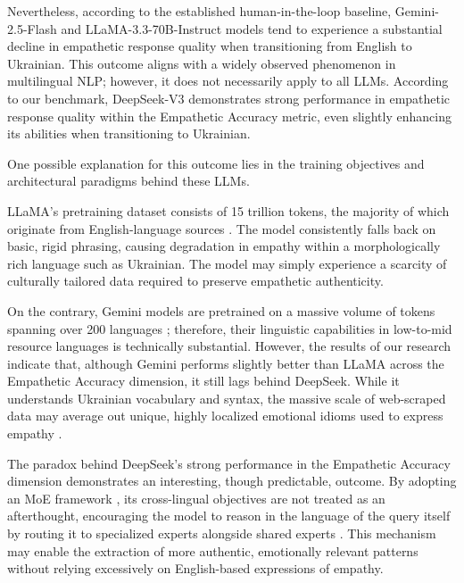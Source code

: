 \documentclass[10pt, twocolumn]{article}
\begin{document}
Nevertheless, according to the established human-in-the-loop baseline, Gemini-2.5-Flash  and LLaMA-3.3-70B-Instruct models tend to experience a substantial decline in empathetic response quality when transitioning from English to Ukrainian. This outcome aligns with a widely observed phenomenon in multilingual NLP; however, it does not necessarily apply to all LLMs. According to our benchmark, DeepSeek-V3 demonstrates strong performance in empathetic response quality within the Empathetic Accuracy metric, even slightly enhancing its abilities when transitioning to Ukrainian.

One possible explanation for this outcome lies in the training objectives and architectural paradigms behind these LLMs.

LLaMA's pretraining dataset consists of 15 trillion tokens, the majority of which originate from English-language sources \cite{grattafiori2024llama3herdmodels}. The model consistently falls back on basic, rigid phrasing, causing degradation in empathy within a morphologically rich language such as Ukrainian. The model may simply experience a scarcity of culturally tailored data required to preserve empathetic authenticity.

On the contrary, Gemini models are pretrained on a massive volume of tokens spanning over 200 languages \cite{comanici2025gemini25pushingfrontier}; therefore, their linguistic capabilities in low-to-mid resource languages is technically substantial. However, the results of our research indicate that, although Gemini performs slightly better than LLaMA across the Empathetic Accuracy dimension, it still lags behind DeepSeek. While it understands Ukrainian vocabulary and syntax, the massive scale of web-scraped data may average out unique, highly localized emotional idioms used to express empathy \cite{rystrom2025multilingual}.

The paradox behind DeepSeek's strong performance in the Empathetic Accuracy dimension demonstrates an interesting, though predictable, outcome. By adopting an MoE framework \cite{deepseekai2025deepseekv3technicalreport}, its cross-lingual objectives are not treated as an afterthought, encouraging the model to reason in the language of the query itself by routing it to specialized experts alongside shared experts \cite{deepseekai2025deepseekv3technicalreport,
wang2024auxiliarylossfreeloadbalancingstrategy}. This mechanism may enable the extraction of more authentic, emotionally relevant patterns without relying excessively on English-based expressions of empathy.
\end{document}
